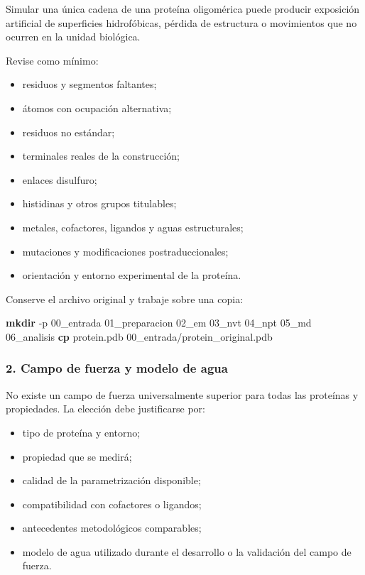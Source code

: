 \documentclass[
  spanish,
  11pt,
  a4paper]{article}
\newenvironment{Shaded}{\begin{snugshade}}{\end{snugshade}}
\newcommand{\AttributeTok}[1]{\textcolor[rgb]{0.13,0.29,0.53}{#1}}
\newcommand{\FunctionTok}[1]{\textcolor[rgb]{0.13,0.29,0.53}{\textbf{#1}}}
\newcommand{\NormalTok}[1]{#1}
\providecommand{\tightlist}{%
  \setlength{\itemsep}{0pt}\setlength{\parskip}{0pt}}
\begin{document}
Simular una única cadena de una proteína oligomérica puede producir
exposición artificial de superficies hidrofóbicas, pérdida de estructura
o movimientos que no ocurren en la unidad biológica.

Revise como mínimo:

\begin{itemize}
\tightlist
\item
  residuos y segmentos faltantes;
\item
  átomos con ocupación alternativa;
\item
  residuos no estándar;
\item
  terminales reales de la construcción;
\item
  enlaces disulfuro;
\item
  histidinas y otros grupos titulables;
\item
  metales, cofactores, ligandos y aguas estructurales;
\item
  mutaciones y modificaciones postraduccionales;
\item
  orientación y entorno experimental de la proteína.
\end{itemize}

Conserve el archivo original y trabaje sobre una copia:

\begin{Shaded}
\begin{Highlighting}[]
\FunctionTok{mkdir} \AttributeTok{{-}p}\NormalTok{ 00\_entrada 01\_preparacion 02\_em 03\_nvt 04\_npt 05\_md 06\_analisis}
\FunctionTok{cp}\NormalTok{ protein.pdb 00\_entrada/protein\_original.pdb}
\end{Highlighting}
\end{Shaded}

\subsubsection{2. Campo de fuerza y modelo de
agua}\label{campo-de-fuerza-y-modelo-de-agua}

No existe un campo de fuerza universalmente superior para todas las
proteínas y propiedades. La elección debe justificarse por:

\begin{itemize}
\tightlist
\item
  tipo de proteína y entorno;
\item
  propiedad que se medirá;
\item
  calidad de la parametrización disponible;
\item
  compatibilidad con cofactores o ligandos;
\item
  antecedentes metodológicos comparables;
\item
  modelo de agua utilizado durante el desarrollo o la validación del
  campo de fuerza.
\end{itemize}
\end{document}
